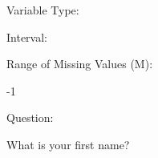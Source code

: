 \documentclass[
]{article}
\begin{document}
\begin{minipage}[t]{0.3\linewidth}

Variable Type:

\end{minipage}%
\begin{minipage}[t]{0.7\linewidth}

\end{minipage}

\begin{minipage}[t]{0.3\linewidth}

Interval:

\end{minipage}%
\begin{minipage}[t]{0.7\linewidth}

\end{minipage}

\begin{minipage}[t]{0.3\linewidth}

Range of Missing Values (M):

\end{minipage}%
\begin{minipage}[t]{0.7\linewidth}

-1

\end{minipage}

\begin{minipage}[t]{0.3\linewidth}

Question:

\end{minipage}%
\begin{minipage}[t]{0.7\linewidth}

What is your first name?

\end{minipage}
\end{document}
